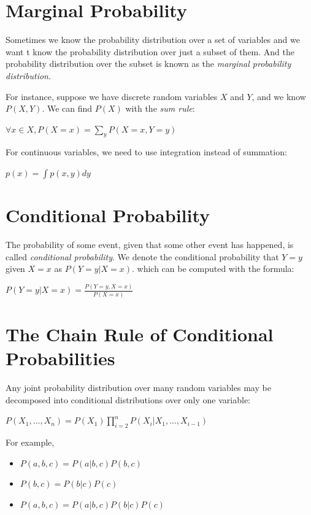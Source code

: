 \documentclass{report}
\begin{document}
\section{Marginal Probability}
Sometimes we know the probability distribution over a set of variables and we want t know the probability distribution over just a subset of them. And the probability distribution over the subset is known as the \textit{marginal probability distribution}.\newline

For instance, suppose we have discrete random variables $X$ and $Y$, and we know $P(X,Y)$.\newline
We can find $P(X)$ with the \textit{sum rule}:\newline
    \centerline{$\forall x \in X, P(X=x) = \sum_y P(X=x,Y=y)$}\newline

For continuous variables, we need to use integration instead of summation:\newline
    \centerline{$p(x) = \int p(x,y)dy$}\newline

\section{Conditional Probability}
The probability of some event, given that some other event has happened, is called
\textit{conditional probability}. We denote the conditional probability that $Y=y$ given $X=x$ as $P(Y=y | X=x)$. which can be computed with the formula:\newline
    \centerline{$P(Y=y | X =x ) = \frac{P(Y=y,X=x)}{P(X=x)}$}\newline

\section{The Chain Rule of Conditional Probabilities}
Any joint probability distribution over many random variables may be decomposed into conditional distributions over only one variable:\newline
    \centerline{$P(X_1,...,X_n) = P(X_1)\prod_{i=2}^{n} P(X_i|X_1,...,X_{i-1})$}\newline

For example,\newline
\begin{itemize}
    \item $P(a,b,c) = P(a|b,c)P(b,c)$
    \item $P(b,c) = P(b|c)P(c)$
    \item $P(a,b,c) = P(a|b,c)P(b|c)P(c)$
\end{itemize}
\end{document}
